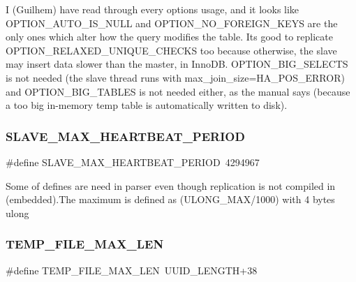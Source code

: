 I (Guilhem) have read through every option\textquotesingle{}s usage, and it looks like O\+P\+T\+I\+O\+N\+\_\+\+A\+U\+T\+O\+\_\+\+I\+S\+\_\+\+N\+U\+LL and O\+P\+T\+I\+O\+N\+\_\+\+N\+O\+\_\+\+F\+O\+R\+E\+I\+G\+N\+\_\+\+K\+E\+YS are the only ones which alter how the query modifies the table. It\textquotesingle{}s good to replicate O\+P\+T\+I\+O\+N\+\_\+\+R\+E\+L\+A\+X\+E\+D\+\_\+\+U\+N\+I\+Q\+U\+E\+\_\+\+C\+H\+E\+C\+KS too because otherwise, the slave may insert data slower than the master, in Inno\+DB. O\+P\+T\+I\+O\+N\+\_\+\+B\+I\+G\+\_\+\+S\+E\+L\+E\+C\+TS is not needed (the slave thread runs with max\+\_\+join\+\_\+size=H\+A\+\_\+\+P\+O\+S\+\_\+\+E\+R\+R\+OR) and O\+P\+T\+I\+O\+N\+\_\+\+B\+I\+G\+\_\+\+T\+A\+B\+L\+ES is not needed either, as the manual says (because a too big in-\/memory temp table is automatically written to disk). \mbox{\label{group__Replication_ga9576e3a9774232077c9cd79f015d9efd}} 
\subsubsection{\texorpdfstring{S\+L\+A\+V\+E\+\_\+\+M\+A\+X\+\_\+\+H\+E\+A\+R\+T\+B\+E\+A\+T\+\_\+\+P\+E\+R\+I\+OD}{SLAVE\_MAX\_HEARTBEAT\_PERIOD}}
{\footnotesize\ttfamily \#define S\+L\+A\+V\+E\+\_\+\+M\+A\+X\+\_\+\+H\+E\+A\+R\+T\+B\+E\+A\+T\+\_\+\+P\+E\+R\+I\+OD~4294967}

Some of defines are need in parser even though replication is not compiled in (embedded).The maximum is defined as (U\+L\+O\+N\+G\+\_\+\+M\+A\+X/1000) with 4 bytes ulong \mbox{\label{group__Replication_gaa195d0860b5c2a3a40362544ec720e70}} 
\subsubsection{\texorpdfstring{T\+E\+M\+P\+\_\+\+F\+I\+L\+E\+\_\+\+M\+A\+X\+\_\+\+L\+EN}{TEMP\_FILE\_MAX\_LEN}}
{\footnotesize\ttfamily \#define T\+E\+M\+P\+\_\+\+F\+I\+L\+E\+\_\+\+M\+A\+X\+\_\+\+L\+EN~U\+U\+I\+D\+\_\+\+L\+E\+N\+G\+TH+38}

